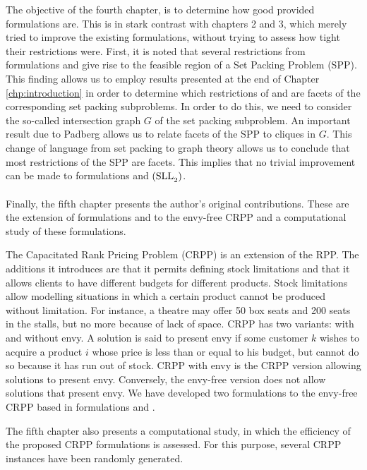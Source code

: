 The objective of the fourth chapter, is to determine how good provided
formulations are. This is in stark contrast with chapters 2 and 3, which merely
tried to improve the existing formulations, without trying to assess how tight
their restrictions were. First, it is noted that several restrictions from
formulations \slla and \sllb give rise to the feasible region of a Set Packing
Problem (SPP). This finding allows us to employ results presented at the end of
Chapter \ref{chp:introduction} in order to determine which restrictions of \slla
and \sllb are facets of the corresponding set packing subproblems. In order to
do this, we need to consider the so-called intersection graph $G$ of the set
packing subproblem. An important result due to Padberg
\cite{pa:facial-structure} allows us to relate facets of the SPP to cliques in
$G$. This change of language from set packing to graph theory allows us to
conclude that most restrictions of the SPP are facets. This implies that no
trivial improvement can be made to formulations \slla and $\rm{(SLL}_2\rm{)}$.

\paragraph*{}

Finally, the fifth chapter presents the author's original contributions. These
are the extension of formulations \slla and \sllb to the envy-free CRPP and a
computational study of these formulations.

The Capacitated Rank Pricing Problem (CRPP) is an extension of the RPP. The
additions it introduces are that it permits defining stock limitations and that
it allows clients to have different budgets for different products. Stock
limitations allow modelling situations in which a certain product cannot be
produced without limitation. For instance, a theatre may offer 50 box seats and
200 seats in the stalls, but no more because of lack of space. CRPP has two
variants: with and without envy. A solution is said to present envy if some
customer $k$ wishes to acquire a product $i$ whose price is less than or equal
to his budget, but cannot do so because it has run out of stock. CRPP with envy
is the CRPP version allowing solutions to present envy. Conversely, the
envy-free version does not allow solutions that present envy. We have developed
two formulations to the envy-free CRPP based in formulations \slla and \sllb.

The fifth chapter also presents a computational study, in which the efficiency
of the proposed CRPP formulations is assessed. For this purpose, several CRPP
instances have been randomly generated.
